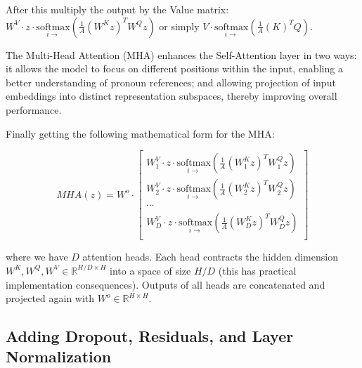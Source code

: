 \noindent After this multiply the output by the Value matrix: $W^V \cdot z \cdot \underset{i \rightarrow}{\mathrm{softmax}}\left( \frac{1}{A} \left(W^K z\right)^T W^Q z \right)$ or simply $V \cdot \underset{i \rightarrow}{\mathrm{softmax}}\left( \frac{1}{A} \left(K \right)^T Q \right)$.

The Multi-Head Attention ($\mathrm{MHA}$) enhances the Self-Attention layer in two ways: it allows the model to focus on different positions within the input, enabling a better understanding of pronoun references; and allowing projection of input embeddings into distinct representation subspaces, thereby improving overall performance.

\noindent Finally getting the following mathematical form for the $\mathrm{MHA}$:


\begin{equation}
MHA(z) =  W^o \cdot
\begin{bmatrix}
    W^V_1 \cdot z \cdot \underset{i \rightarrow}{\mathrm{softmax}}\left( \frac{1}{A} \left(W^K_1 z\right)^T W^Q_1 z \right)\\
    W^V_2 \cdot z \cdot \underset{i \rightarrow}{\mathrm{softmax}}\left( \frac{1}{A} \left(W^K_2 z\right)^T W^Q_2 z \right)\\
    \cdots\\
    W^V_D \cdot z \cdot \underset{i \rightarrow}{\mathrm{softmax}}\left( \frac{1}{A} \left(W^K_D z\right)^T W^Q_D z \right)\\
\end{bmatrix}\nonumber
\end{equation}

where we have $D$ attention heads. Each head contracts the hidden dimension $W^K, W^Q, W^V \in \mathbb{R}^{H / D \times H}$ into a space of size $H / D$ (this has practical implementation consequences). Outputs of all heads are concatenated and projected again with $W^o \in \mathbb{R}^{H \times H}$.

\subsection{Adding Dropout, Residuals, and Layer Normalization}



